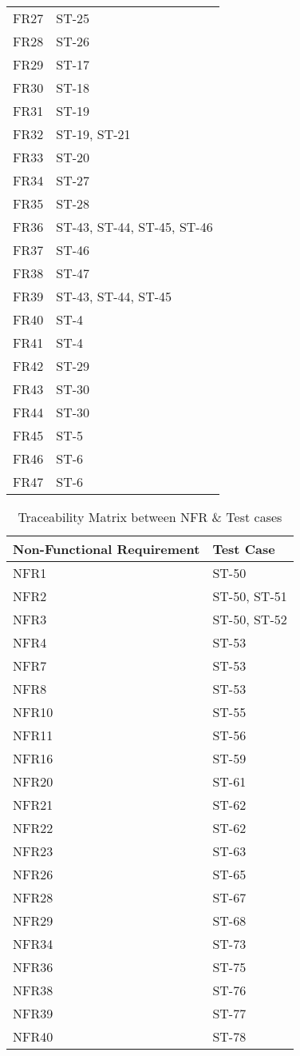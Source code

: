 \documentclass[12pt, titlepage]{article}
\begin{document}
\begin{longtable}{|l|l|}
		FR27  & ST-25\\
		FR28  & ST-26\\
		FR29  & ST-17\\
		FR30  & ST-18\\
		FR31  & ST-19\\
		FR32  & ST-19, ST-21\\
		FR33  & ST-20\\
		FR34  & ST-27\\
		FR35  & ST-28\\
		FR36  & ST-43, ST-44, ST-45, ST-46\\
		FR37  & ST-46\\
		FR38  & ST-47\\
		FR39  & ST-43, ST-44, ST-45\\
		FR40  & ST-4\\
		FR41  & ST-4\\
		FR42  & ST-29\\
		FR43  & ST-30\\
		FR44  & ST-30\\
		FR45  & ST-5\\
		FR46  & ST-6\\
		FR47  & ST-6\\
		\hline
	\end{longtable}
	
	\newpage
	
	\begin{longtable}{|l|l|}
		\caption{Traceability Matrix between NFR \& Test cases}\\
		\hline
		Non-Functional Requirement &  Test Case\\
		\hline
		NFR1  & ST-50\\
		NFR2  & ST-50, ST-51\\
		NFR3  & ST-50, ST-52\\
		NFR4  & ST-53\\
		NFR7  & ST-53\\
		NFR8  & ST-53\\
		NFR10  & ST-55\\
		NFR11  & ST-56\\
		NFR16  & ST-59\\
		NFR20  & ST-61\\
		NFR21  & ST-62\\
		NFR22  & ST-62\\
		NFR23  & ST-63\\
		NFR26  & ST-65\\
		NFR28  & ST-67\\
		NFR29  & ST-68\\
		NFR34  & ST-73\\
		NFR36  & ST-75\\
		NFR38  & ST-76\\
		NFR39  & ST-77\\
		NFR40  & ST-78\\
		\hline
	\end{longtable}
	
\end{document}
